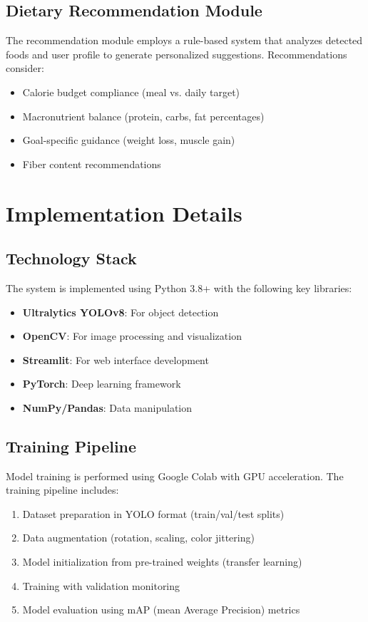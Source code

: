 \documentclass[conference]{IEEEtran}
\begin{document}
\subsection{Dietary Recommendation Module}
The recommendation module employs a rule-based system that analyzes detected foods and user profile to generate personalized suggestions. Recommendations consider:
\begin{itemize}
    \item Calorie budget compliance (meal vs. daily target)
    \item Macronutrient balance (protein, carbs, fat percentages)
    \item Goal-specific guidance (weight loss, muscle gain)
    \item Fiber content recommendations
\end{itemize}

\section{Implementation Details}

\subsection{Technology Stack}
The system is implemented using Python 3.8+ with the following key libraries:
\begin{itemize}
    \item \textbf{Ultralytics YOLOv8}: For object detection
    \item \textbf{OpenCV}: For image processing and visualization
    \item \textbf{Streamlit}: For web interface development
    \item \textbf{PyTorch}: Deep learning framework
    \item \textbf{NumPy/Pandas}: Data manipulation
\end{itemize}

\subsection{Training Pipeline}
Model training is performed using Google Colab with GPU acceleration. The training pipeline includes:
\begin{enumerate}
    \item Dataset preparation in YOLO format (train/val/test splits)
    \item Data augmentation (rotation, scaling, color jittering)
    \item Model initialization from pre-trained weights (transfer learning)
    \item Training with validation monitoring
    \item Model evaluation using mAP (mean Average Precision) metrics
\end{enumerate}
\end{document}
